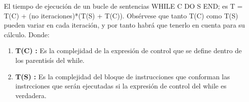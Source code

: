 El tiempo de ejecución de un bucle de sentencias WHILE C DO S END; es T = T(C) + (no iteraciones)*(T(S) + T(C)). Obsérvese que tanto T(C) como T(S)
pueden variar en cada iteración, y por tanto habrá que tenerlo en cuenta para su
cálculo. Donde:

\begin{enumerate}
	\item \textbf{T(C) :} Es la complejidad de la expresión de control que se define dentro de los parentisís del while.
	\item \textbf{T(S) :} Es la complejidad del bloque de instrucciones que conforman las instrcciones que serán ejecutadas si la expresión de control del while es verdadera. 
\end{enumerate}
